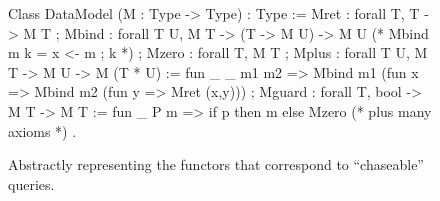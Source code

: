 \documentclass[preprint]{sigplanconf}
\begin{document}
\begin{figure}[t]
\label{fig:chaseable-functor}
\begin{coq}
Class DataModel (M : Type -> Type) : Type :=
{ Mret  : forall {T}, T -> M T
; Mbind : forall {T U}, M T -> (T -> M U) -> M U (* Mbind m k = x <- m ; k *)
; Mzero : forall {T}, M T
; Mplus : forall {T U}, M T -> M U -> M (T * U) :=
     fun _ _ m1 m2 => Mbind m1 (fun x => Mbind m2 (fun y => Mret (x,y)))
; Mguard : forall {T}, bool -> M T -> M T :=
     fun _ P m => if p then m else Mzero
 (* plus many axioms *)    
}.
\end{coq}






\caption{Abstractly representing the functors  that correspond to ``chaseable'' queries.}
\label{fig:chaseable-functor}
\end{figure}
\end{document}
